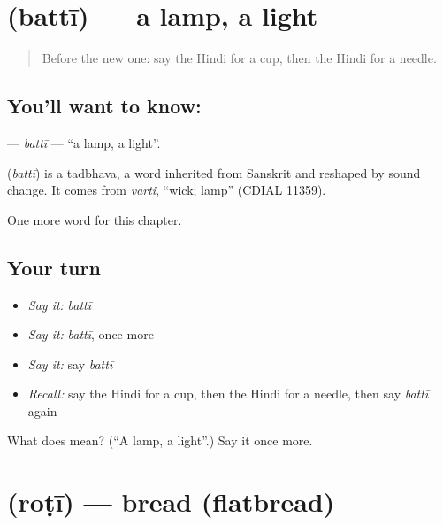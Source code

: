 \section[\texorpdfstring{\hi{बत्ती} (battī)}{बत्ती (battī)}]{ (battī) — a lamp, a light}

\label{lesson:HI-C209-batti}



\begin{quote}
Before the new one: say the Hindi for a cup, then the Hindi for a needle.
\end{quote}

\subsection*{You'll want to know: }
\textbf{} — \emph{battī} — \textquotedblleft{}a lamp, a light\textquotedblright{}.

\begin{cousinweb}
\textbf{} (\emph{battī}) is a tadbhava, a word inherited from Sanskrit and reshaped by sound change. It comes from \emph{varti}, \textquotedblleft{}wick; lamp\textquotedblright{} (CDIAL 11359).
\end{cousinweb}

\begin{grammarlens}[title={What you've built}]
One more word for this chapter.
\end{grammarlens}

\subsection*{Your turn}
\begin{itemize}
\raggedright
  \item \emph{Say it:} \emph{battī}
  \item \emph{Say it:} \emph{battī}, once more
  \item \emph{Say it:} say \emph{battī}
  \item \emph{Recall:} say the Hindi for a cup, then the Hindi for a needle, then say \emph{battī} again
\end{itemize}

\begin{tcolorbox}[breakable,colback=teal!4,colframe=teal!35!black,title={Before you move on}]
What does  mean? (\textquotedblleft{}A lamp, a light\textquotedblright{}.) Say it once more.
\end{tcolorbox}
\section[\texorpdfstring{\hi{रोटी} (roṭī)}{रोटी (roṭī)}]{ (roṭī) — bread (flatbread)}

